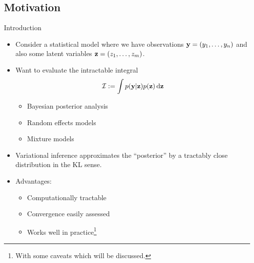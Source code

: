 \subsection{Motivation}

\begin{frame}{Introduction}
  \begin{itemize}
      \item Consider a statistical model where we have observations ${\mathbf y} = (y_1, \dots, y_n)$ and also some latent variables ${\mathbf z} = (z_1, \dots, z_m)$.
    \pause  
    \item Want to evaluate the intractable integral
    \[
      {\mathcal I} := \int p({\mathbf y}|{\mathbf z})p({\mathbf z}) \, \text{d}{\mathbf z}
    \]
    \begin{itemize}
      \item Bayesian posterior analysis
      \item Random effects models 
      \item Mixture models
    \end{itemize}
    \item Variational inference approximates the ``posterior'' by a tractably close distribution in the KL sense.
    \item Advantages:
    \begin{itemize}
      \item Computationally tractable
      \item Convergence easily assessed
      \item Works well in practice\footnote{With some caveats which will be discussed.} 
    \end{itemize}
  \end{itemize}
\end{frame}

